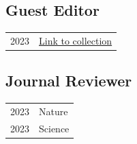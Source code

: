 

\subsection*{Guest Editor}
% 
\begin{longtable}[l]{@{}p{} p{}@{}}


    2023 & \href{https://example.com}{Link to collection} \\

\end{longtable}


\subsection*{Journal Reviewer}
% 
\begin{longtable}[l]{@{}p{} p{}@{}}

    2023 & Nature\\
    2023 & Science \\
    
\end{longtable}


